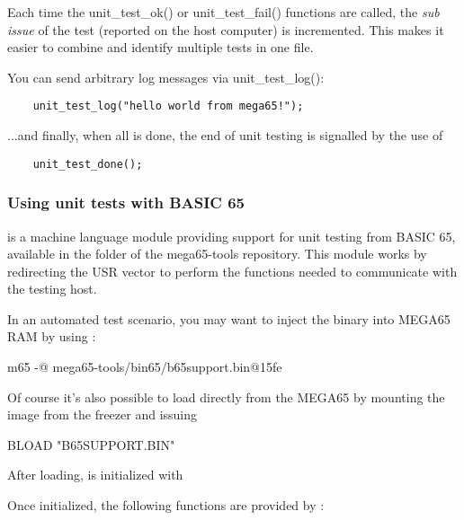 Each time the unit\_test\_ok() or unit\_test\_fail() 
functions are called, the \textit{sub issue} of the test (reported on 
the host computer) is incremented. This makes it easier to combine and 
identify multiple tests in one file.

You can send arbitrary log messages via unit\_test\_log():

\begin{verbatim}
    unit_test_log("hello world from mega65!");
\end{verbatim}

...and finally, when all is done, the end of unit testing is signalled
by the use of

\begin{verbatim}
    unit_test_done();
\end{verbatim}


\subsubsection{Using unit tests with BASIC 65}

 is a machine language module providing support for 
unit testing from BASIC 65, available in the  folder of the mega65-tools
repository. This module works by redirecting the USR vector to perform the functions 
needed to communicate with the testing host.

In an automated test scenario, you may want to inject the  
binary into MEGA65 RAM by using :

    \begin{screenoutput}
        m65 -@ mega65-tools/bin65/b65support.bin@15fe
    \end{screenoutput}


Of course it's also possible to load  directly from the
MEGA65 by mounting the  image from the freezer and issuing

\begin{screenoutput}
    BLOAD "B65SUPPORT.BIN"
\end{screenoutput}

After loading,  is initialized with


Once initialized, the following functions are provided by :


